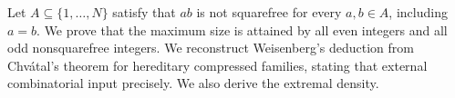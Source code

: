 Let $A\subseteq\{1,\ldots,N\}$ satisfy that $ab$ is not squarefree for every $a,b\in A$, including $a=b$. We prove that the maximum size is attained by all even integers and all odd nonsquarefree integers. We reconstruct Weisenberg's deduction from Chv\'atal's theorem for hereditary compressed families, stating that external combinatorial input precisely. We also derive the extremal density.
